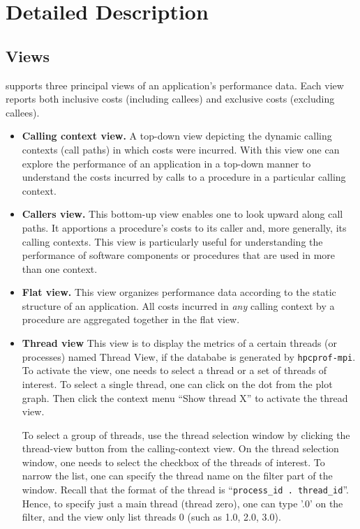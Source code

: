 \documentclass[english]{article}
\begin{document}
\section{Detailed Description}

\subsection{Views}

 supports three principal views of an application's performance data.
Each view reports both inclusive costs (including callees) and exclusive costs (excluding callees).

\begin{itemize}

\item \textbf{Calling context view.}
A top-down view depicting the dynamic calling contexts (call paths) in which costs were incurred.
With this view one can explore the performance of an application in a top-down manner
to understand the costs incurred by calls to a procedure in a particular calling context.

\item \textbf{Callers view.}
This bottom-up view enables one to look upward along call paths.
It apportions a procedure's costs to its caller and, more generally,
its calling contexts.
This view is particularly useful for understanding the performance of software components or procedures
that are used in more than one context.

\item \textbf{Flat view.}
This view organizes performance data according to the static structure of an application.
All costs incurred in \emph{any} calling context by a procedure are aggregated together in the flat view.

\item \textbf{Thread view}
	This view is to display the metrics of a certain threads (or processes) named Thread View, if the datababe is generated by \texttt{hpcprof-mpi}.
To activate the view, one needs to select a thread or a set of threads of interest.
To select a single thread, one can click on the dot from the plot graph.
Then click the context menu ``Show thread X'' to activate the thread view.

To select a group of threads, use the thread selection window by clicking the thread-view button from the calling-context view.
On the thread selection window, one needs to select the checkbox of the threads of interest. 
To  narrow the list, one can specify the thread name on the filter part of the window.
Recall that the format of the thread is ``\texttt{process\_id . thread\_id}''.
Hence, to specify just a main thread (thread zero), one can type '.0' on the filter, and the view only list threads 0 (such as 1.0, 2.0, 3.0).


\end{itemize}
\end{document}
